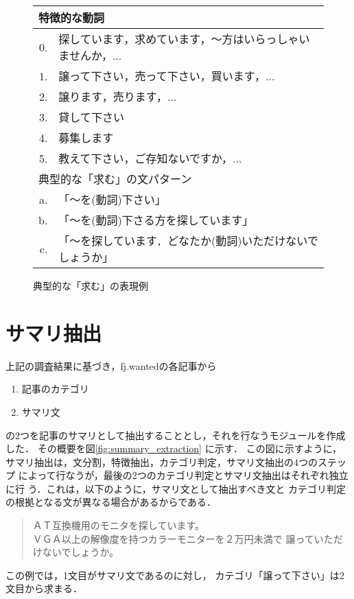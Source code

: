 \begin{figure}
\begin{center} 
\begin{tabular}{|rl|} \hline
\multicolumn{2}{|l|}{特徴的な動詞} \\ \hline
0. & 探しています，求めています，〜方はいらっしゃいませんか，... \\
1. & 譲って下さい，売って下さい，買います，... \\
2. & 譲ります，売ります，... \\
3. & 貸して下さい \\
4. & 募集します \\
5. & 教えて下さい，ご存知ないですか，...  \\ \hline\hline
\multicolumn{2}{|l|}{典型的な「求む」の文パターン} \\ \hline
a. & 「〜を(動詞)下さい」\\
b. & 「〜を(動詞)下さる方を探しています」 \\
c. & 「〜を探しています．どなたか(動詞)いただけないでしょうか」 \\ \hline
\end{tabular}
\end{center}
\caption{典型的な「求む」の表現例}
\label{fig:pattern_example}
\vspace*{10mm}
\end{figure}

\section{サマリ抽出}

上記の調査結果に基づき，fj.wantedの各記事から
\begin{enumerate} 
\item 記事のカテゴリ
\item サマリ文
\end{enumerate}
の2つを記事のサマリとして抽出することとし，それを行なうモジュールを作成した．
その概要を図\ref{fig:summary_extraction} に示す．
この図に示すように，
サマリ抽出は，文分割，特徴抽出，カテゴリ判定，サマリ文抽出の4つのステップ
によって行なうが，最後の2つのカテゴリ判定とサマリ文抽出はそれぞれ独立に行
う．これは，以下のように，サマリ文として抽出すべき文と
カテゴリ判定の根拠となる文が異なる場合があるからである．
\begin{quote}
ＡＴ互換機用のモニタを探しています。\\
ＶＧＡ以上の解像度を持つカラーモニターを２万円未満で
譲っていただけないでしょうか。
\end{quote}
この例では，1文目がサマリ文であるのに対し，
カテゴリ「譲って下さい」は2文目から求まる．

